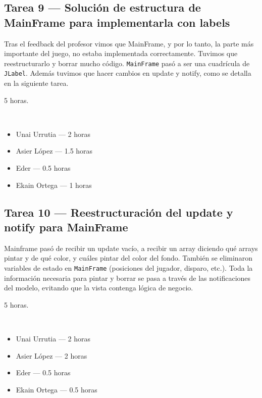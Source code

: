 \documentclass[12pt, a4paper]{article}
\begin{document}
\vspace{0.8em}

\subsection*{Tarea 9 — Solución de estructura de MainFrame para implementarla con labels}
\begin{description}[leftmargin=2em, style=nextline]
    \item[\textbf{Descripción:}] Tras el feedback del profesor vimos que MainFrame, y por lo tanto, la parte más importante del juego, no estaba implementada correctamente. Tuvimos que reestructurarlo y borrar mucho código. \texttt{MainFrame} pasó a ser una cuadrícula de \texttt{JLabel}. Además tuvimos que hacer cambios en update y notify, como se detalla en la siguiente tarea.
    \item[\textbf{Tiempo:}] 5 horas.
    \item[\textbf{Responsables y dedicación:}]~
        \begin{itemize}[leftmargin=1em, nosep]
            \item Unai Urrutia — 2 horas
            \item Asier López — 1.5 horas
            \item Eder — 0.5 horas
            \item Ekain Ortega — 1 horas
        \end{itemize}
\end{description}

\vspace{0.8em}

\subsection*{Tarea 10 — Reestructuración del update y notify para MainFrame}
\begin{description}[leftmargin=2em, style=nextline]
    \item[\textbf{Descripción:}] Mainframe pasó de recibir un update vacío, a recibir un array diciendo qué arrays pintar y de qué color, y cuáles pintar del color del fondo. También se eliminaron variables de estado en \texttt{MainFrame} (posiciones del jugador, disparo, etc.). Toda la información necesaria para pintar y borrar se pasa a través de las notificaciones del modelo, evitando que la vista contenga lógica de negocio.
    \item[\textbf{Tiempo:}] 5 horas.
    \item[\textbf{Responsables y dedicación:}]~
        \begin{itemize}[leftmargin=1em, nosep]
            \item Unai Urrutia — 2 horas
            \item Asier López — 2 horas
            \item Eder — 0.5 horas
            \item Ekain Ortega — 0.5 horas
        \end{itemize}
\end{description}
\end{document}
